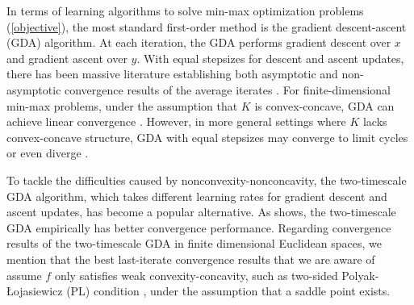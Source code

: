 \documentclass[11pt]{article}
\newcommand{\1}{\mathds{1}}
\begin{document}
In terms of learning algorithms to solve min-max optimization problems (\ref{objective}), the most standard first-order method is the gradient descent-ascent (GDA) algorithm. At each iteration, the GDA performs gradient descent over $x$ and gradient ascent over $y$. With equal stepsizes for descent and ascent updates, there has been massive literature establishing both asymptotic and non-asymptotic convergence results of the average iterates \cite{korpelevich1976extragradient, nemirovski2004prox, nedic2009subgradient}. For finite-dimensional min-max problems, under the assumption that  $K$ is convex-concave, GDA can achieve linear convergence \cite{cherukuri2017saddle, adolphs2019local, liang2019interaction}. 
However, in more general settings where $K$ lacks convex-concave structure, GDA with equal stepsizes may converge to limit cycles or even diverge \cite{balduzzi2018mechanics, hommes2012multiple, mertikopoulos2018cycles, daskalakis2018training, bailey2020finite}.



To tackle the difficulties caused by nonconvexity-nonconcavity, the
two-timescale GDA algorithm, which takes different learning rates
for gradient descent and ascent updates, has
become a popular alternative. As \cite{heusel2017gans} shows, the
two-timescale GDA empirically has better convergence
performance. Regarding convergence results of the two-timescale GDA in
finite dimensional Euclidean spaces, we mention that the best
last-iterate convergence results that we are aware of assume $f$ only
satisfies weak convexity-concavity, such as two-sided
Polyak-\L{}ojasiewicz (PL) condition \cite{doan2022convergence,
  yang2020global}, under the assumption that a saddle point exists.
\end{document}
